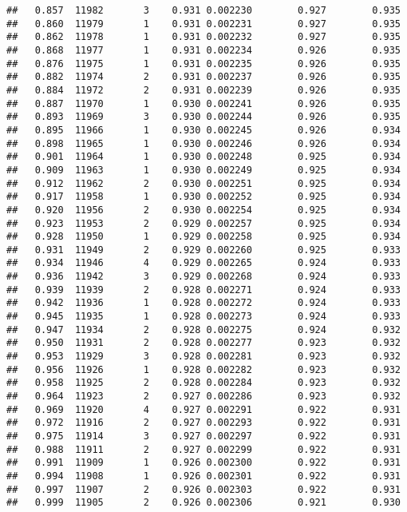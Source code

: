 \documentclass[
]{book}
\begin{document}
\begin{verbatim}
##   0.857  11982       3    0.931 0.002230        0.927        0.935
##   0.860  11979       1    0.931 0.002231        0.927        0.935
##   0.862  11978       1    0.931 0.002232        0.927        0.935
##   0.868  11977       1    0.931 0.002234        0.926        0.935
##   0.876  11975       1    0.931 0.002235        0.926        0.935
##   0.882  11974       2    0.931 0.002237        0.926        0.935
##   0.884  11972       2    0.931 0.002239        0.926        0.935
##   0.887  11970       1    0.930 0.002241        0.926        0.935
##   0.893  11969       3    0.930 0.002244        0.926        0.935
##   0.895  11966       1    0.930 0.002245        0.926        0.934
##   0.898  11965       1    0.930 0.002246        0.926        0.934
##   0.901  11964       1    0.930 0.002248        0.925        0.934
##   0.909  11963       1    0.930 0.002249        0.925        0.934
##   0.912  11962       2    0.930 0.002251        0.925        0.934
##   0.917  11958       1    0.930 0.002252        0.925        0.934
##   0.920  11956       2    0.930 0.002254        0.925        0.934
##   0.923  11953       2    0.929 0.002257        0.925        0.934
##   0.928  11950       1    0.929 0.002258        0.925        0.934
##   0.931  11949       2    0.929 0.002260        0.925        0.933
##   0.934  11946       4    0.929 0.002265        0.924        0.933
##   0.936  11942       3    0.929 0.002268        0.924        0.933
##   0.939  11939       2    0.928 0.002271        0.924        0.933
##   0.942  11936       1    0.928 0.002272        0.924        0.933
##   0.945  11935       1    0.928 0.002273        0.924        0.933
##   0.947  11934       2    0.928 0.002275        0.924        0.932
##   0.950  11931       2    0.928 0.002277        0.923        0.932
##   0.953  11929       3    0.928 0.002281        0.923        0.932
##   0.956  11926       1    0.928 0.002282        0.923        0.932
##   0.958  11925       2    0.928 0.002284        0.923        0.932
##   0.964  11923       2    0.927 0.002286        0.923        0.932
##   0.969  11920       4    0.927 0.002291        0.922        0.931
##   0.972  11916       2    0.927 0.002293        0.922        0.931
##   0.975  11914       3    0.927 0.002297        0.922        0.931
##   0.988  11911       2    0.927 0.002299        0.922        0.931
##   0.991  11909       1    0.926 0.002300        0.922        0.931
##   0.994  11908       1    0.926 0.002301        0.922        0.931
##   0.997  11907       2    0.926 0.002303        0.922        0.931
##   0.999  11905       2    0.926 0.002306        0.921        0.930

\end{verbatim}
\end{document}
